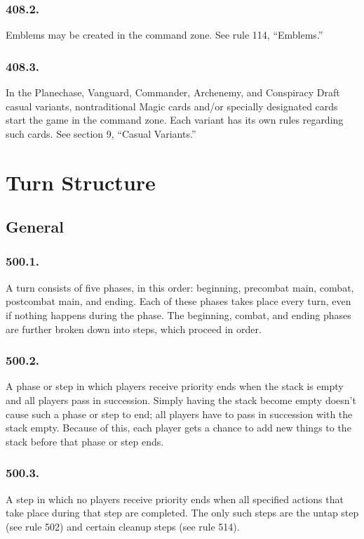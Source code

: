 \subsection*{408.2.}
Emblems may be created in the command zone. See rule 114, “Emblems.”

\subsection*{408.3.}
In the Planechase, Vanguard, Commander, Archenemy, and Conspiracy Draft casual variants, nontraditional Magic cards and/or specially designated cards start the game in the command zone. Each variant has its own rules regarding such cards. See section 9, “Casual Variants.”

\chapter{Turn Structure}
\setcounter{section}{499}
\section{General}
\subsection*{500.1.}
A turn consists of five phases, in this order: beginning, precombat main, combat, postcombat main, and ending. Each of these phases takes place every turn, even if nothing happens during the phase. The beginning, combat, and ending phases are further broken down into steps, which proceed in order.

\subsection*{500.2.}
A phase or step in which players receive priority ends when the stack is empty and all players pass in succession. Simply having the stack become empty doesn’t cause such a phase or step to end; all players have to pass in succession with the stack empty. Because of this, each player gets a chance to add new things to the stack before that phase or step ends.

\subsection*{500.3.}
A step in which no players receive priority ends when all specified actions that take place during that step are completed. The only such steps are the untap step (see rule 502) and certain cleanup steps (see rule 514).

